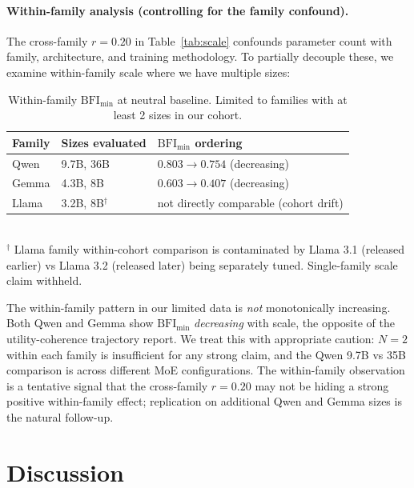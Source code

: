 \documentclass[11pt,a4paper]{article}
\begin{document}
\paragraph{Within-family analysis (controlling for the family confound).}
The cross-family $r = 0.20$ in Table~\ref{tab:scale} confounds parameter count with family, architecture, and training methodology. To partially decouple these, we examine within-family scale where we have multiple sizes:
\begin{table}[h]
\centering
\caption{Within-family $\text{BFI}_{\min}$ at neutral baseline. Limited to families with at least 2 sizes in our cohort.}
\label{tab:scale_within}
\begin{tabular}{lll}
\toprule
Family & Sizes evaluated & $\text{BFI}_{\min}$ ordering \\
\midrule
Qwen   & 9.7B, 36B          & $0.803 \to 0.754$ (decreasing) \\
Gemma  & 4.3B, 8B           & $0.603 \to 0.407$ (decreasing) \\
Llama  & 3.2B, 8B$^\dagger$ & not directly comparable (cohort drift) \\
\bottomrule
\end{tabular}
\\[4pt]
\footnotesize
$^\dagger$ Llama family within-cohort comparison is contaminated by Llama 3.1 (released earlier) vs Llama 3.2 (released later) being separately tuned. Single-family scale claim withheld.
\end{table}

The within-family pattern in our limited data is \emph{not} monotonically increasing. Both Qwen and Gemma show $\text{BFI}_{\min}$ \emph{decreasing} with scale, the opposite of the utility-coherence trajectory \citet{mazeika2025utility} report. We treat this with appropriate caution: $N = 2$ within each family is insufficient for any strong claim, and the Qwen 9.7B vs 35B comparison is across different MoE configurations. The within-family observation is a tentative signal that the cross-family $r = 0.20$ may not be hiding a strong positive within-family effect; replication on additional Qwen and Gemma sizes is the natural follow-up.


\section{Discussion}
\label{sec:discussion}
\end{document}
